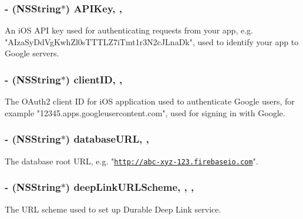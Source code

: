 \subsubsection[{A\+P\+I\+Key}]{\setlength{\rightskip}{0pt plus 5cm}-\/ (N\+S\+String$\ast$) A\+P\+I\+Key\hspace{0.3cm}{\ttfamily [read]}, {\ttfamily [nonatomic]}, {\ttfamily [copy]}}\label{interface_f_i_r_options_a2f9c250e190723a628bb31448881d00e}
An i\+O\+S A\+P\+I key used for authenticating requests from your app, e.\+g. "A\+Iza\+Sy\+Dd\+Vg\+Kwh\+Zl0s\+T\+T\+T\+L\+Z7i\+Tmt1r3\+N2c\+J\+Lna\+Dk", used to identify your app to Google servers. \hypertarget{interface_f_i_r_options_ac0c91f0107e390601b54ebb9b985a73d}{}
\subsubsection[{client\+I\+D}]{\setlength{\rightskip}{0pt plus 5cm}-\/ (N\+S\+String$\ast$) client\+I\+D\hspace{0.3cm}{\ttfamily [read]}, {\ttfamily [nonatomic]}, {\ttfamily [copy]}}\label{interface_f_i_r_options_ac0c91f0107e390601b54ebb9b985a73d}
The O\+Auth2 client I\+D for i\+O\+S application used to authenticate Google users, for example "12345.\+apps.\+googleusercontent.\+com", used for signing in with Google. \hypertarget{interface_f_i_r_options_a1b580617dcf73298c00751c17f5416e7}{}
\subsubsection[{database\+U\+R\+L}]{\setlength{\rightskip}{0pt plus 5cm}-\/ (N\+S\+String$\ast$) database\+U\+R\+L\hspace{0.3cm}{\ttfamily [read]}, {\ttfamily [nonatomic]}, {\ttfamily [copy]}}\label{interface_f_i_r_options_a1b580617dcf73298c00751c17f5416e7}
The database root U\+R\+L, e.\+g. "\href{http://abc-xyz-123.firebaseio.com}{\tt http\+://abc-\/xyz-\/123.\+firebaseio.\+com}". \hypertarget{interface_f_i_r_options_a921544459ae221b937fea5a8d70ece2e}{}
\subsubsection[{deep\+Link\+U\+R\+L\+Scheme}]{\setlength{\rightskip}{0pt plus 5cm}-\/ (N\+S\+String$\ast$) deep\+Link\+U\+R\+L\+Scheme\hspace{0.3cm}{\ttfamily [read]}, {\ttfamily [write]}, {\ttfamily [nonatomic]}, {\ttfamily [copy]}}\label{interface_f_i_r_options_a921544459ae221b937fea5a8d70ece2e}
The U\+R\+L scheme used to set up Durable Deep Link service. \hypertarget{interface_f_i_r_options_a9b1714f84847f9d9883a60b3d3e855c2}{}
